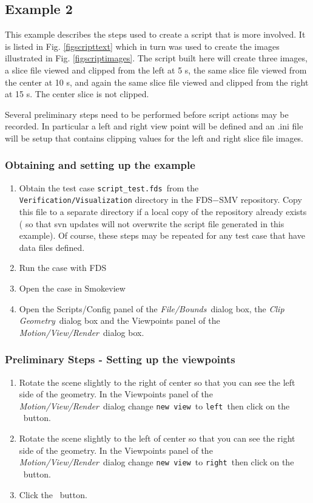 \documentclass[11pt,twoside]{book}
\newcommand{\frameit}[1]{\fbox{\tt #1}}
\begin{document}
\subsection{Example 2}
This example describes the steps used to create a script that is more involved.
It is listed
in Fig. \ref{figscripttext} which in turn was used to
create the images
illustrated in Fig. \ref{figscriptimages}.  The script built here
will create three images,
a slice file viewed and clipped from the left at 5 s,
the same slice file viewed from the center at 10 s,
and again the same slice file viewed and clipped from the right at 15 s.
The center slice is not clipped.

Several preliminary steps need to be performed before script actions may be recorded.
In particular a left and right view point will be defined and
an .ini file will be setup that contains clipping values for the
left and right slice file images.

\subsubsection{Obtaining and setting up the example}

\begin{enumerate}
\item Obtain the test case {\tt script\_test.fds}\ from the
    {\tt Verification/Visualization} directory in
the FDS$-$SMV repository.  Copy this file to a separate directory
 if a local copy of the repository already exists
 ( so that svn updates will not overwrite the script
 file generated in this example).  Of course, these steps may be repeated
 for any test case that have data files defined.
\item Run the case with FDS \item Open the case in Smokeview \item
Open the Scripts/Config panel of the {\em File/Bounds}\ dialog
box, the {\em Clip Geometry}\ dialog box and the Viewpoints panel
of the {\em Motion/View/Render}\ dialog box.
\end{enumerate}

\subsubsection{Preliminary Steps - Setting up the viewpoints}

\begin{enumerate}
\item Rotate the scene slightly to the right of center so that you
can see the left side of the geometry.  In the Viewpoints panel of
the {\em Motion/View/Render}\ dialog change {\tt new view}\ to
{\tt left}\
    then click on the \frameit{Add}\ button.
\item Rotate the scene slightly to the left of center so that you
can see the right side of the geometry.  In the Viewpoints panel
of the {\em Motion/View/Render}\ dialog change {\tt new view}\ to
{\tt right}\
    then click on the \frameit{Add}\ button.
\item Click the \frameit{Save Settings}\ button.
\end{enumerate}
\end{document}

